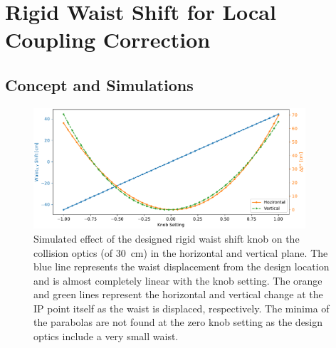 




\section{Rigid Waist Shift for Local Coupling Correction}

\subsection{Concept and Simulations}

\begin{figure}
    \centering
    \includegraphics[width=0.9\textwidth]{Figures/Chapter4/rigid_waist_shift_effect_combined.pdf}
    \caption{Simulated effect of the designed rigid waist shift knob on the collision optics (\betastar of \qty{30}{\centi\metre}) in the horizontal and vertical plane. The blue line represents the waist displacement from the design location and is almost completely linear with the knob setting. The orange and green lines represent the horizontal and vertical \betafunctions change at the IP point itself as the waist is displaced, respectively. The minima of the parabolas are not found at the zero knob setting as the design optics include a very small waist.}
    \label{figure:rigid_waist_shift_knob_effect1}
\end{figure}

